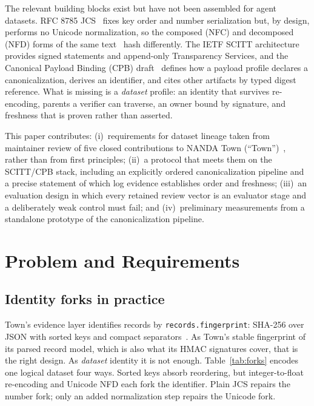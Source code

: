 \documentclass[conference]{IEEEtran}
\begin{document}
The relevant building blocks exist but have not been assembled for agent datasets. RFC 8785 JCS~\cite{rfc8785} fixes key order and number serialization but, by design, performs no Unicode normalization, so the composed (NFC) and decomposed (NFD) forms of the same text~\cite{uax15} hash differently. The IETF SCITT architecture~\cite{rfc9943} provides signed statements and append-only Transparency Services, and the Canonical Payload Binding (CPB) draft~\cite{cpb03} defines how a payload profile declares a canonicalization, derives an identifier, and cites other artifacts by typed digest reference. What is missing is a \emph{dataset} profile: an identity that survives re-encoding, parents a verifier can traverse, an owner bound by signature, and freshness that is proven rather than asserted.

This paper contributes:
(i)~requirements for dataset lineage taken from maintainer review of five closed contributions to NANDA Town (``Town'')~\cite{town}, rather than from first principles;
(ii)~a protocol that meets them on the SCITT/CPB stack, including an explicitly ordered canonicalization pipeline and a precise statement of which log evidence establishes order and freshness;
(iii)~an evaluation design in which every retained review vector is an evaluator stage and a deliberately weak control must fail; and
(iv)~preliminary measurements from a standalone prototype of the canonicalization pipeline.

\section{Problem and Requirements}

\subsection{Identity forks in practice}
Town's evidence layer identifies records by \texttt{records.fingerprint}: SHA-256 over JSON with sorted keys and compact separators~\cite{town}. As Town's stable fingerprint of its parsed record model, which is also what its HMAC signatures cover, that is the right design. As \emph{dataset} identity it is not enough. Table~\ref{tab:forks} encodes one logical dataset four ways. Sorted keys absorb reordering, but integer-to-float re-encoding and Unicode NFD each fork the identifier. Plain JCS repairs the number fork; only an added normalization step repairs the Unicode fork.
\end{document}
